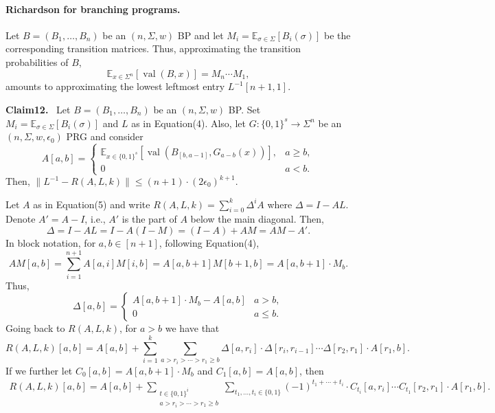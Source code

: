 \documentclass[10pt,a4paper]{article}
\newenvironment{authorclaim}[1]{\par\medskip\noindent\textbf{#1.}\ }{\par\medskip}
\begin{document}
\paragraph{Richardson for branching programs.} Let $B=(B_1,\ldots,B_n)$ be an $(n,\Sigma,w)$ BP and let $M_i=\mathbb E_{\sigma\in\Sigma}[B_i(\sigma)]$ be the corresponding transition matrices. Thus, approximating the transition probabilities of $B$,
\[\mathbb E_{x\in\Sigma^n}[\operatorname{val}(B,x)]=M_n\cdots M_1,\]
amounts to approximating the lowest leftmost entry $L^{-1}[n+1,1]$.
\begin{authorclaim}{Claim12}
Let $B=(B_1,\ldots,B_n)$ be an $(n,\Sigma,w)$ BP. Set $M_i=\mathbb E_{\sigma\in\Sigma}[B_i(\sigma)]$ and $L$ as in Equation(4). Also, let $G:\{0,1\}^s\to\Sigma^n$ be an $(n,\Sigma,w,\epsilon_0)$ PRG and consider
\begin{equation}\tag{5}A[a,b]=\begin{cases}\mathbb E_{x\in\{0,1\}^s}[\operatorname{val}(B_{[b,a-1]},G_{a-b}(x))],&a\ge b,\\0&a<b.\end{cases}\end{equation}
Then, $\|L^{-1}-R(A,L,k)\|\le(n+1)\cdot(2\epsilon_0)^{k+1}$.
\end{authorclaim}
Let $A$ as in Equation(5) and write $R(A,L,k)=\sum_{i=0}^k\Delta^iA$ where $\Delta=I-AL$. Denote $A'=A-I$, i.e., $A'$ is the part of $A$ below the main diagonal. Then,
\[\Delta=I-AL=I-A(I-M)=(I-A)+AM=AM-A'.\]
In block notation, for $a,b\in[n+1]$, following Equation(4),
\[AM[a,b]=\sum_{i=1}^{n+1}A[a,i]M[i,b]=A[a,b+1]M[b+1,b]=A[a,b+1]\cdot M_b.\]
Thus,
\begin{equation}\tag{6}\Delta[a,b]=\begin{cases}A[a,b+1]\cdot M_b-A[a,b]&a>b,\\0&a\le b.\end{cases}\end{equation}
Going back to $R(A,L,k)$, for $a>b$ we have that
\begin{equation}\tag{7}R(A,L,k)[a,b]=A[a,b]+\sum_{i=1}^k\sum_{a>r_i>\cdots>r_1\ge b}\Delta[a,r_i]\cdot\Delta[r_i,r_{i-1}]\cdots\Delta[r_2,r_1]\cdot A[r_1,b].\end{equation}
If we further let $C_0[a,b]=A[a,b+1]\cdot M_b$ and $C_1[a,b]=A[a,b]$, then
\begin{equation}\tag{8}\begin{aligned}R(A,L,k)[a,b]=A[a,b]+\sum_{\substack{t\in\{0,1\}^i\\a>r_i>\cdots>r_1\ge b}}\sum_{t_1,\ldots,t_i\in\{0,1\}}(-1)^{t_1+\cdots+t_i}\cdot C_{t_i}[a,r_i]\cdots C_{t_1}[r_2,r_1]\cdot A[r_1,b].\end{aligned}\end{equation}
\end{document}
